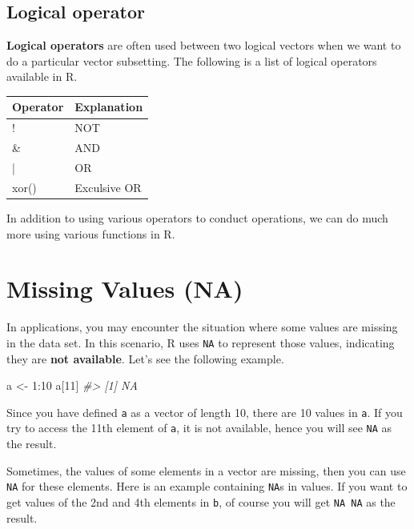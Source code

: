 \documentclass[
]{book}
\newenvironment{Shaded}{\begin{snugshade}}{\end{snugshade}}
\newcommand{\CommentTok}[1]{\textcolor[rgb]{0.56,0.35,0.01}{\textit{#1}}}
\newcommand{\DecValTok}[1]{\textcolor[rgb]{0.00,0.00,0.81}{#1}}
\newcommand{\NormalTok}[1]{#1}
\newcommand{\OtherTok}[1]{\textcolor[rgb]{0.56,0.35,0.01}{#1}}
\newcommand{\SpecialCharTok}[1]{\textcolor[rgb]{0.00,0.00,0.00}{#1}}
\begin{document}
\hypertarget{logical-operator}{%
\subsection{Logical operator}\label{logical-operator}}

\textbf{Logical operators} are often used between two logical vectors when we want to do a particular vector subsetting. The following is a list of logical operators available in R.

\begin{tabular}{l|l}
\hline
Operator & Explanation\\
\hline
! & NOT\\
\hline
\& & AND\\
\hline
| & OR\\
\hline
xor() & Exculsive OR\\
\hline
\end{tabular}

In addition to using various operators to conduct operations, we can do much more using various functions in R.

\hypertarget{na}{%
\section{Missing Values (NA)}\label{na}}

In applications, you may encounter the situation where some values are missing in the data set. In this scenario, R uses \texttt{NA} to represent those values, indicating they are \textbf{not available}. Let's see the following example.

\begin{Shaded}
\begin{Highlighting}[]
\NormalTok{a }\OtherTok{\textless{}{-}} \DecValTok{1}\SpecialCharTok{:}\DecValTok{10}
\NormalTok{a[}\DecValTok{11}\NormalTok{]}
\CommentTok{\#\textgreater{} [1] NA}
\end{Highlighting}
\end{Shaded}

Since you have defined \texttt{a} as a vector of length 10, there are 10 values in \texttt{a}. If you try to access the 11th element of \texttt{a}, it is not available, hence you will see \texttt{NA} as the result.

Sometimes, the values of some elements in a vector are missing, then you can use \texttt{NA} for these elements. Here is an example containing \texttt{NA}s in values. If you want to get values of the 2nd and 4th elements in \texttt{b}, of course you will get \texttt{NA\ NA} as the result.
\end{document}
